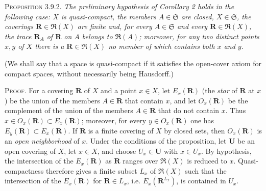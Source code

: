 \textsc{Proposition 3.9.2.} \textit{The preliminary hypothesis of
Corollary \textup{2} holds in the following case: $X$ is quasi-compact, the members
$A\in\mathfrak S$ are closed, $X\in\mathfrak S$, the coverings
$\mathbf R\in\mathfrak R(X)$ are finite and, for every $A\in\mathfrak S$ and
every $\mathbf R\in\mathfrak R(X)$, the trace $\mathbf R_A$ of $\mathbf R$ on
$A$ belongs to $\mathfrak R(A)$; moreover, for any two distinct points $x,y$
of $X$ there is a $\mathbf R\in\mathfrak R(X)$ no member of which contains
both $x$ and $y$.}

(We shall say that a space is quasi-compact if it satisfies the open-cover
axiom for compact spaces, without necessarily being Hausdorff.)

\textsc{Proof.} For a covering $\mathbf R$ of $X$ and a point
$x\in X$, let $E_x(\mathbf R)$ (the \emph{star} of $\mathbf R$ at $x$) be the union
of the members $A\in\mathbf R$ that contain $x$, and let $O_x(\mathbf R)$ be
the complement of the union of the members $A\in\mathbf R$ that do not
contain $x$.
Thus $x\in O_x(\mathbf R)\subset E_x(\mathbf R)$; moreover, for every
$y\in O_x(\mathbf R)$ one has $E_y(\mathbf R)\subset E_x(\mathbf R)$.
If $\mathbf R$ is a finite covering of $X$ by closed sets, then
$O_x(\mathbf R)$ is an \textit{open neighborhood} of $x$.
Under the conditions of the proposition, let $\mathbf U$ be an open covering
of $X$, let $x\in X$, and choose $U_x\in\mathbf U$ with $x\in U_x$. By
hypothesis, the intersection of the $E_x(\mathbf R)$ as $\mathbf R$ ranges
over $\mathfrak R(X)$ is reduced to $x$. Quasi-compactness therefore gives a
finite subset $L_x$ of $\mathfrak R(X)$ such that the intersection of the
$E_x(\mathbf R)$ for $\mathbf R\in L_x$, i.e.
$E_x(\mathbf R^{L_x})$, is contained in $U_x$.

